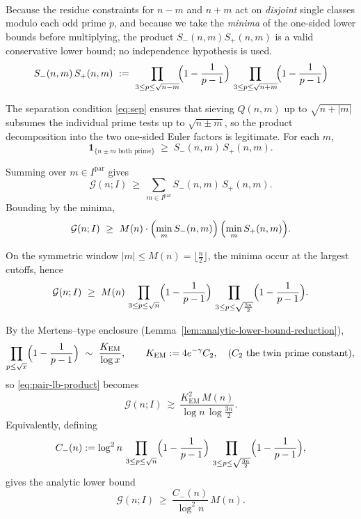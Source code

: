 \documentclass[11pt]{article}
\makeatletter
\theoremstyle{inline}
\theoremstyle{break}
\renewenvironment{proof}[1][\proofname]{%
  \par\pushQED{\qed}%
  \normalfont \topsep6\p@\@plus6\p@\relax
  \trivlist
  \item[\hskip\labelsep
        \itshape
    #1\@addpunct{.}]\mbox{}\\  %
}{%
  \popQED\endtrivlist\@endpefalse
}
\theoremstyle{break}
\theoremstyle{break}
\theoremstyle{break}
\theoremstyle{break}
\theoremstyle{break}
\theoremstyle{break}
\theoremstyle{inline}
\newcommand{\CminusProduct}{C_{-}}
\newcommand{\Kem}{K_{\mathrm{EM}}}              %
\makeatother
\begin{document}
\begin{proof}
Because the residue constraints for \(n-m\) and \(n+m\) act on \emph{disjoint} single classes modulo each odd prime \(p \), and because we take the \emph{minima} of the one-sided lower bounds before multiplying, the product \(S_-(n,m)S_+(n,m)\) is a valid conservative lower bound; no independence hypothesis is used.
\begin{equation}
S_{-}(n,m)\,S_{+}(n,m)
\ :=\
\prod_{3\le p\le \sqrt{n-m}}\!\Bigl(1-\frac{1}{p-1}\Bigr)\,
\prod_{3\le p\le \sqrt{n+m}}\!\Bigl(1-\frac{1}{p-1}\Bigr)
\end{equation}

The separation condition \eqref{eq:sep} ensures that sieving \(Q(n,m)\) up to \(\sqrt{n+|m|}\) subsumes the individual prime tests up to \(\sqrt{n\pm m}\), so the product decomposition into the two one-sided Euler factors is legitimate.  For each \(m\),
\begin{equation}
\mathbf{1}_{\{\text{\(n\pm m\) both prime}\}}\;\ge\;S_-(n,m)\,S_+(n,m).
\end{equation}

Summing over \(m\in I^{\mathrm{par}}\) gives
\begin{equation}
\mathcal G(n;I)\ \ge\ \sum_{m\in I^{\mathrm{par}}} S_-(n,m)\,S_+(n,m).
\end{equation}
Bounding by the minima,
\begin{equation}
\mathcal G(n;I)\ \ge\
M(n)\cdot\Bigl(\min_{m}S_-(n,m)\Bigr)\,\Bigl(\min_{m}S_+(n,m)\Bigr).
\end{equation}

On the symmetric window \(|m|\le M(n)=\lfloor \frac{n}{2}\rfloor\), the minima
occur at the largest cutoffs, hence
\begin{equation}\label{eq:pair-lb-product}
\mathcal G(n;I)\ \ge\
M(n)\,
\prod_{3\le p\le \sqrt n}\Bigl(1-\frac{1}{p-1}\Bigr)\,
\prod_{3\le p\le \sqrt{\frac{3n}{2}}}\Bigl(1-\frac{1}{p-1}\Bigr).
\end{equation}

\medskip
\noindent
By the Mertens--type enclosure (Lemma~\ref{lem:analytic-lower-bound-reduction}),
\begin{equation}
\prod_{p\le \sqrt x}\Bigl(1-\frac{1}{p-1}\Bigr)\ \sim\ \frac{\Kem}{\log x},
\qquad \Kem:=4e^{-\gamma}C_2,\quad (C_2 \text{ the twin prime constant}),
\end{equation}
so \eqref{eq:pair-lb-product} becomes
\begin{equation}
\mathcal G(n;I)\ \gtrsim\
\frac{\Kem^2\,M(n)}{\log n\,\log{\frac{3n}{2}}}.
\end{equation}
Equivalently, defining
\begin{equation}\label{eq:Cminus}
\CminusProduct(n)
:=\log^2 n\,
\prod_{3\le p\le \sqrt n}\Bigl(1-\frac{1}{p-1}\Bigr)\,
\prod_{3\le p\le \sqrt{\frac{3n}{2}}}\Bigl(1-\frac{1}{p-1}\Bigr),
\end{equation}
gives the analytic lower bound
\begin{equation}
\mathcal G(n;I)\ \ge\ \frac{\CminusProduct(n)}{\log^2 n}\,M(n).
\end{equation}


\end{proof}
\end{document}
